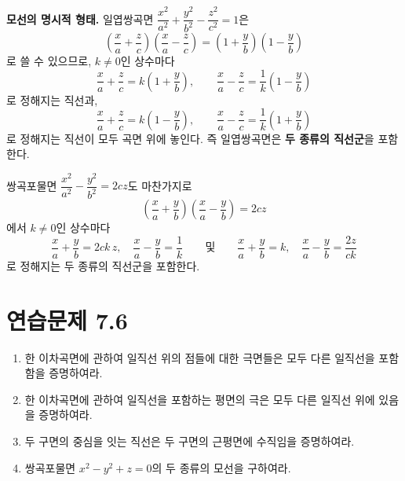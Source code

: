 \documentclass{article}
\theoremstyle{mystyle}
\begin{document}
\textbf{모선의 명시적 형태.} 일엽쌍곡면 \(\dfrac{x^2}{a^2}+\dfrac{y^2}{b^2}-\dfrac{z^2}{c^2}=1\)은
\[
\left(\frac{x}{a}+\frac{z}{c}\right)\left(\frac{x}{a}-\frac{z}{c}\right)=\left(1+\frac{y}{b}\right)\left(1-\frac{y}{b}\right)
\]
로 쓸 수 있으므로, \(k\ne0\)인 상수마다
\[
\frac{x}{a}+\frac{z}{c}=k\left(1+\frac{y}{b}\right),\qquad \frac{x}{a}-\frac{z}{c}=\frac{1}{k}\left(1-\frac{y}{b}\right)
\]
로 정해지는 직선과,
\[
\frac{x}{a}+\frac{z}{c}=k\left(1-\frac{y}{b}\right),\qquad \frac{x}{a}-\frac{z}{c}=\frac{1}{k}\left(1+\frac{y}{b}\right)
\]
로 정해지는 직선이 모두 곡면 위에 놓인다. 즉 일엽쌍곡면은 \textbf{두 종류의 직선군}을 포함한다.

쌍곡포물면 \(\dfrac{x^2}{a^2}-\dfrac{y^2}{b^2}=2cz\)도 마찬가지로
\[
\left(\frac{x}{a}+\frac{y}{b}\right)\left(\frac{x}{a}-\frac{y}{b}\right)=2cz
\]
에서 \(k\ne0\)인 상수마다
\[
\frac{x}{a}+\frac{y}{b}=2ck\,z,\quad \frac{x}{a}-\frac{y}{b}=\frac{1}{k}
\qquad\text{및}\qquad
\frac{x}{a}+\frac{y}{b}=k,\quad \frac{x}{a}-\frac{y}{b}=\frac{2z}{ck}
\]
로 정해지는 두 종류의 직선군을 포함한다.

\section*{연습문제 7.6}
\begin{enumerate}
    \item 한 이차곡면에 관하여 일직선 위의 점들에 대한 극면들은 모두 다른 일직선을 포함함을 증명하여라.
    \item 한 이차곡면에 관하여 일직선을 포함하는 평면의 극은 모두 다른 일직선 위에 있음을 증명하여라.
    \item 두 구면의 중심을 잇는 직선은 두 구면의 근평면에 수직임을 증명하여라.
    \item 쌍곡포물면 \(x^2-y^2+z=0\)의 두 종류의 모선을 구하여라.
\end{enumerate}
\end{document}
